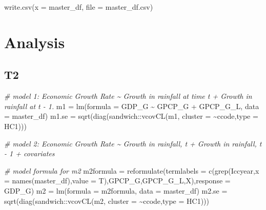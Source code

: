 \documentclass[
]{article}
\newenvironment{Shaded}{\begin{snugshade}}{\end{snugshade}}
\newcommand{\AttributeTok}[1]{\textcolor[rgb]{0.77,0.63,0.00}{#1}}
\newcommand{\CommentTok}[1]{\textcolor[rgb]{0.56,0.35,0.01}{\textit{#1}}}
\newcommand{\FunctionTok}[1]{\textcolor[rgb]{0.00,0.00,0.00}{#1}}
\newcommand{\NormalTok}[1]{#1}
\newcommand{\OtherTok}[1]{\textcolor[rgb]{0.56,0.35,0.01}{#1}}
\newcommand{\SpecialCharTok}[1]{\textcolor[rgb]{0.00,0.00,0.00}{#1}}
\newcommand{\StringTok}[1]{\textcolor[rgb]{0.31,0.60,0.02}{#1}}
\begin{document}
\begin{Shaded}
\begin{Highlighting}[]
\FunctionTok{write.csv}\NormalTok{(}\AttributeTok{x =}\NormalTok{ master\_df, }\AttributeTok{file =} \StringTok{\textquotesingle{}master\_df.csv\textquotesingle{}}\NormalTok{)}
\end{Highlighting}
\end{Shaded}

\hypertarget{analysis}{%
\section{Analysis}\label{analysis}}

\hypertarget{t2}{%
\subsection{T2}\label{t2}}

\begin{Shaded}
\begin{Highlighting}[]
\CommentTok{\# model 1: Economic Growth Rate \textasciitilde{} Growth in rainfall at time t + Growth in rainfall at t {-} 1. }
\NormalTok{m1 }\OtherTok{=} \FunctionTok{lm}\NormalTok{(}\AttributeTok{formula =}\NormalTok{ GDP\_G }\SpecialCharTok{\textasciitilde{}}\NormalTok{ GPCP\_G }\SpecialCharTok{+}\NormalTok{ GPCP\_G\_L, }\AttributeTok{data =}\NormalTok{ master\_df)}
\NormalTok{m1.se }\OtherTok{=} \FunctionTok{sqrt}\NormalTok{(}\FunctionTok{diag}\NormalTok{(sandwich}\SpecialCharTok{::}\FunctionTok{vcovCL}\NormalTok{(m1, }\AttributeTok{cluster =} \SpecialCharTok{\textasciitilde{}}\NormalTok{ccode,}\AttributeTok{type =} \StringTok{\textquotesingle{}HC1\textquotesingle{}}\NormalTok{)))}

\CommentTok{\# model 2: Economic Growth Rate \textasciitilde{} Growth in rainfall, t +  Growth in rainfall, t {-} 1 + covariates}


\CommentTok{\# model formula for m2}
\NormalTok{m2formula }\OtherTok{=} \FunctionTok{reformulate}\NormalTok{(}\AttributeTok{termlabels =} \FunctionTok{c}\NormalTok{(}\FunctionTok{grep}\NormalTok{(}\StringTok{\textquotesingle{}Iccyear\textquotesingle{}}\NormalTok{,}\AttributeTok{x =} \FunctionTok{names}\NormalTok{(master\_df),}\AttributeTok{value =}\NormalTok{ T),}\StringTok{\textquotesingle{}GPCP\_G\textquotesingle{}}\NormalTok{,}\StringTok{\textquotesingle{}GPCP\_G\_L\textquotesingle{}}\NormalTok{,X),}\AttributeTok{response =} \StringTok{\textquotesingle{}GDP\_G\textquotesingle{}}\NormalTok{)}
\NormalTok{m2 }\OtherTok{=} \FunctionTok{lm}\NormalTok{(}\AttributeTok{formula =}\NormalTok{ m2formula, }\AttributeTok{data =}\NormalTok{ master\_df)}
\NormalTok{m2.se }\OtherTok{=} \FunctionTok{sqrt}\NormalTok{(}\FunctionTok{diag}\NormalTok{(sandwich}\SpecialCharTok{::}\FunctionTok{vcovCL}\NormalTok{(m2, }\AttributeTok{cluster =} \SpecialCharTok{\textasciitilde{}}\NormalTok{ccode,}\AttributeTok{type =} \StringTok{\textquotesingle{}HC1\textquotesingle{}}\NormalTok{)))}


\end{Highlighting}
\end{Shaded}
\end{document}
